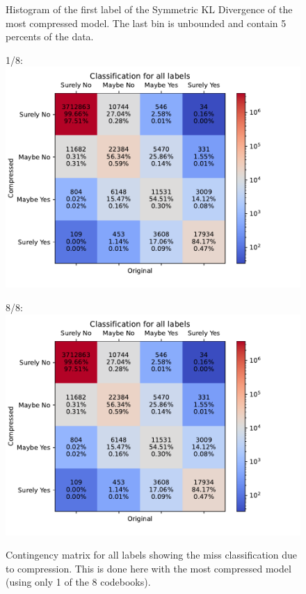 \documentclass[runningheads]{llncs}
\begin{document}
\begin{figure}
\begin{minipage}{0.45\linewidth}
\end{minipage}
\caption{Histogram of the first label of the Symmetric KL Divergence of the most compressed model. The last bin is 
unbounded and contain 5 percents of the data.}
\end{figure}

\begin{figure}
\begin{minipage}{0.5\linewidth}
1/8:\\
\includegraphics[width=1.1\textwidth,trim= 0 0 0 0.9cm,clip]{figures/8_1_contengency_combined.pdf}
\end{minipage}
\hfill
\begin{minipage}{0.5\linewidth}
8/8:\\
\includegraphics[width=1.1\textwidth,trim= 0 0 0 0.9cm,clip]{figures/8_1_contengency_combined.pdf}
\end{minipage}
\caption{Contingency matrix for all labels showing the miss classification due to compression. This is done here with 
the most compressed model (using only 1 of the 8 codebooks).}
\end{figure}

\printbibliography
\end{document}
